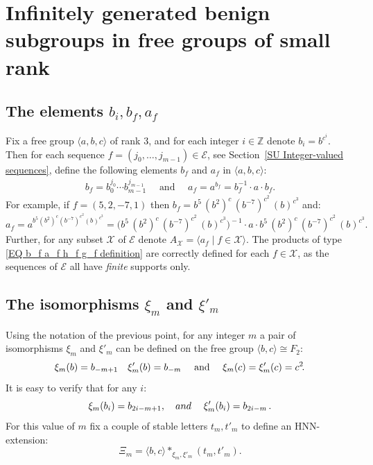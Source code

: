 \documentclass[12pt, a4paper]{amsart}
\newcommand{\E}{{\mathcal E}}
\newcommand{\Z}{{\mathbb Z}}
\newcommand{\1}{\{1\}}
\theoremstyle{plain}
\theoremstyle{definition}
\theoremstyle{remark}
\numberwithin{equation}{section}
\begin{document}
\section{Infinitely generated benign subgroups in free groups of small rank}
\label{SE Infinitely generated benign subgroups}

\subsection{The elements $b_i, b_f, a_f$}
\label{SU the elements bi bf af} 

Fix a free group $\langle a,b,c \rangle$ of rank $3$, and for each integer $i\in \Z$ denote $b_i=b^{c^i}$\!.  Then for each sequence $f=(j_0,\ldots,j_{m-1})\in \E$, see Section~\ref{SU Integer-valued sequences}, define the following elements $b_f$ and $a_f$ in $\langle a,b,c \rangle$:
\begin{equation}
\label{EQ b_f a_f h_f g_f definition}
\begin{split}
\text{
$b_f=b_{0}^{j_0} \cdots b_{m-1}^{j_{m-1}}
\quad \text{ and } \quad 
a_f=a^{b_f} = b_f^{-1} \cdot a \cdot  b_f$.
}
\end{split}
\end{equation}
For example, if $f=(5,2,-7,1)$ then 
$b_f = b^5\, (b^2)^{c}\, (b^{-7})^{c^2} \,(b)^{c^3}$ and: 
$$
a_f = a^{b^5 (b^2)^{c} (b^{-7})^{c^2} (b)^{c^3}}\!= 
\Big(b^5\, (b^2)^{c}\, (b^{-7})^{c^2}\, (b)^{c^3}\Big)^{\!-1}\!\!\!\!
\cdot a \cdot b^5\, (b^2)^{c}\, (b^{-7})^{c^2}\, (b)^{c^3}\!\!.
$$
%
Further, for any subset $\mathcal X$ of $\E$ denote $A_{\mathcal X}=\langle a_f \mathrel{|} f\!\in \mathcal X \rangle$. The products of type \eqref{EQ b_f a_f h_f g_f definition} are correctly defined for each $f\in \mathcal X$, as the sequences of $\E$ all have \textit{finite} supports only.

\subsection{The isomorphisms $\xi_m$ and $\xi'_m$}
\label{SU The isomorphisms ksi} 
Using the notation of the previous point, for any integer $m$ a pair of isomorphisms $\xi_m$ and $\xi'_m$  can be defined on the free group $\langle b,c \rangle\cong F_2$:
\begin{equation}
\label{EQ definition of xi_m}
\text{
$\xi_m(b)=b_{-m+1}\quad
\xi'_m(b)=b_{-m}$
\quad and \quad
$\xi_m(c)=\xi'_m(c)=c^2$\!.
}
\end{equation}
%
It is easy to verify that for any $i$:
$$
\xi_m(b_i)=b_{2i-m+1}, 
\quad{\rm and}\quad\;
\xi'_m(b_i)=b_{2i-m}\,.
$$
%
For this value of $m$ fix a couple of stable letters $t_m, t'_m$ to define an HNN-extension: 
$$
\Xi_m = \langle b,c \rangle *_{\xi_m, \xi'_m} (t_m, t'_m).
$$
\end{document}
